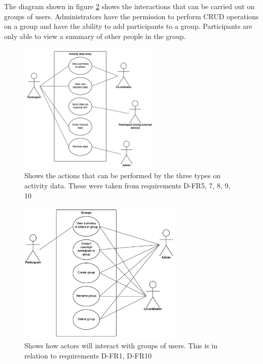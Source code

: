 The diagram shown in figure \ref{fig:use-case-group} shows the interactions that can be carried out on groups of users. Administrators have the permission to perform CRUD operations on a group and have the ability to add participants to a group. Participants are only able to view a summary of other people in the group.

\begin{figure}[H]
\centering
\includegraphics[width=0.6\textwidth]{../design/UML/UseCase/Participant-Activity-Data.png}
\caption{Shows the actions that can be performed by the three types on activity data. These were taken from requirements D-FR5, 7, 8, 9, 10}
\label{fig:use-case-activity-data}
\end{figure}

\begin{figure}[H]
\centering
\includegraphics[width=0.7\textwidth]{../design/UML/UseCase/Groups.png}
\caption{Shows how actors will interact with groups of users. This is in relation to requirements D-FR1, D-FR10}
\label{fig:use-case-group}
\end{figure}

